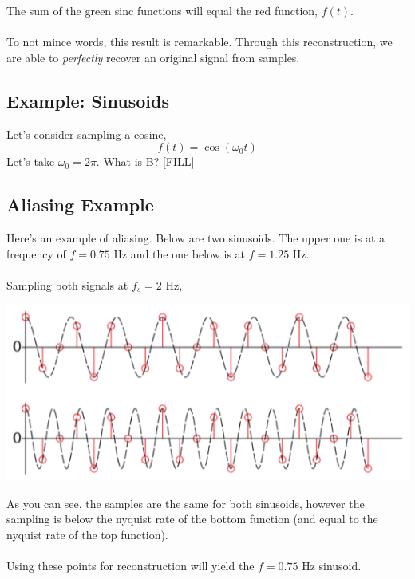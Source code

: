 \documentclass[10pt]{article}
\begin{document}
The sum of the green sinc functions will equal the red function, $f(t)$.\\\\
To not mince words, this result is remarkable.  Through this reconstruction, we are able to \textit{perfectly} recover an original signal from samples.

\subsection*{Example: Sinusoids}
Let's consider sampling a cosine,
\[f(t) = \cos(\omega_0 t)\]
Let's take $\omega_0 = 2\pi$.  What is B?
[FILL]

\subsection*{Aliasing Example}
Here's an example of aliasing.  Below are two sinusoids.  The upper one is at a frequency of $f=0.75$ Hz and the one below is at $f = 1.25$ Hz.\\\\
Sampling both signals at $f_s = 2$ Hz,
\begin{center}
    \includegraphics*[scale=0.8]{W8_17.png}
\end{center}
As you can see, the samples are the same for both sinusoids, however the sampling is below the nyquist rate of the bottom function (and equal to the nyquist rate of the top function).\\\\
Using these points for reconstruction will yield the $f=0.75$ Hz sinusoid.
\end{document}
